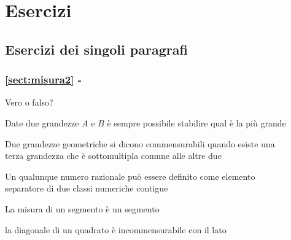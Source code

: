 
\begin{comment}
\noindent\begin{minipage}{.5\textwidth}

\end{minipage}
\begin{minipage}{.5\textwidth}
\begin{inaccessibleblock}[Figura: TODO]
 \begin{center}  \end{center}
\end{inaccessibleblock}
\end{minipage}
\end{comment}

\section{Esercizi}

\subsection{Esercizi dei singoli paragrafi}

\begingroup
\hypersetup{linkcolor=black}
\subsubsection*{\ref{sect:misura2} - }
\endgroup

\begin{esercizio}
\label{ese:6.1}
Vero o falso?
\begin{enumeratea}
\item Date due grandezze \(A\) e \(B\) è sempre possibile stabilire qual 
è la più grande
\hfill\boxV\quad\boxF
\item Due grandezze geometriche si dicono commensurabili quando esiste una \\
terza grandezza che è sottomultipla comune alle altre due 
\hfill{\boxV\quad\boxF}
\item Un qualunque numero razionale può essere definito come elemento \\
separatore di due classi numeriche contigue
\hfill\boxV\quad\boxF
\item La misura di un segmento è un segmento
\hfill\boxV\quad\boxF
\item la diagonale di un quadrato è incommensurabile con il lato
\hfill\boxV\quad\boxF
\end{enumeratea}
\end{esercizio}

